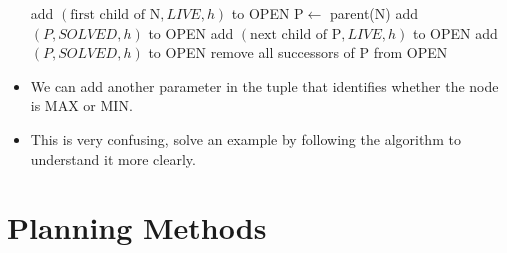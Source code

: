 \documentclass[a4paper]{article}
\begin{document}
\begin{itemize}
\begin{algorithm}[H]
\begin{algorithmic}[1]
                        \EndFor
                        \State add $(\text{first child of N},LIVE,h)$ to OPEN
                    \EndIf
                \EndIf
                \Statex
                    \State P$\gets$ parent(N)
                        \State add $(P,SOLVED,h)$ to OPEN
                        \State add $(\text{next child of P},LIVE,h)$ to OPEN
                        \State add $(P,SOLVED,h)$ to OPEN
                        \State remove all successors of P from OPEN
                    \EndIf
                \EndIf
            \EndWhile
        \end{algorithmic}
    \end{algorithm}
    \item We can add another parameter in the tuple that identifies whether the node is MAX or MIN.
    \item This is very confusing, solve an example by following the algorithm to understand it more clearly.
\end{itemize}
\pagebreak

\section{Planning Methods}
\end{document}
